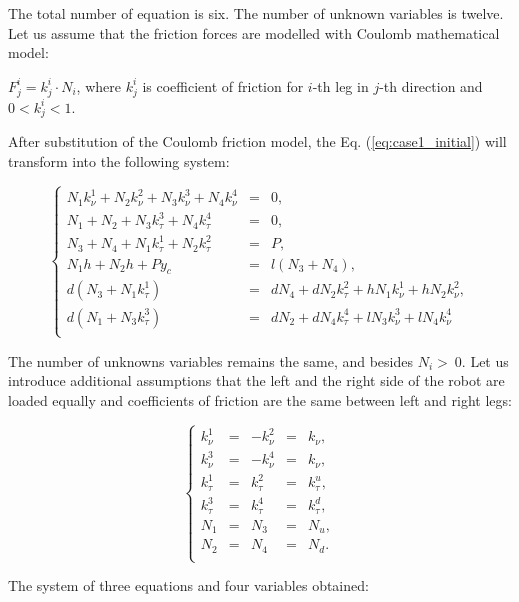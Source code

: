 \documentclass{ws-procs9x6}
\begin{document}
The total number of equation is six. The number of unknown variables is twelve. Let us assume that the friction forces are modelled with Coulomb mathematical model:

$F_j^i = k_j^i\cdot N_i$, where $k_j^i$ is coefficient of friction for $i$-th leg in $j$-th direction and $0<k_j^i<1$.

After substitution of the Coulomb friction model, the Eq. (\ref{eq:case1_initial}) will transform into the following system:

\begin{equation}
\label{eq:case1_subs_kulon}
\left\{
\begin{array}{rcl}
  N_1k_\nu^1 + N_2k_\nu^2 + N_3k_\nu^3 + N_4k_\nu^4 &=& 0,\\
  N_1 + N_2 + N_3k_\tau^3 + N_4k_\tau^4 &=& 0, \\
  N_3 + N_4 + N_1k_\tau^1 + N_2k_\tau^2 &=& P, \\
  N_1h + N_2h + Py_c &=& l(N_3 + N_4), \\
  d(N_3 + N_1k_\tau^1) &=& dN_4 + dN_2k_\tau^2 + hN_1k_\nu^1 + hN_2k_\nu^2,\\
  d(N_1 + N_3k_\tau^3) &=& dN_2 + dN_4k_\tau^4 + lN_3k_\nu^3 + lN_4k_\nu^4\\
\end{array}
\right.
\end{equation}

The number of unknowns variables remains the same, and besides $N_i >~0$. Let us introduce additional assumptions that the left and the right side of the robot are loaded equally and coefficients of friction are the same between left and right legs:

\begin{equation}
\label{eq:case1_assumptions_1_and_2}
\left\{
\begin{array}{rcccl}
    k_\nu^1  &=& -k_\nu^2&=& k_\nu,\\
    k_\nu^3  &=& -k_\nu^4&=& k_\nu,\\
    k_\tau^1 &= &k_\tau^2&=& k_\tau^u,\\
    k_\tau^3 &= &k_\tau^4&=& k_\tau^d,\\
    N_1 &=& N_3 &=& N_u, \\
    N_2 &=& N_4 &=& N_d. \\
\end{array}
\right.
\end{equation}

The system of three equations and four variables obtained:
\end{document}
